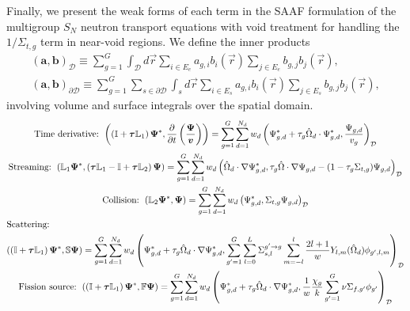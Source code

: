 \documentclass[letterpaper]{mc2025}
\begin{document}
Finally, we present the weak forms of each term in the \gls*{SAAF} formulation of the multigroup
$S_N$ neutron transport equations with void treatment \cite{wang_diffusion_2014} for handling the
$1/\Sigma_{t,g}$ term in near-void regions. We define the inner products
%
\begin{gather}
  \left(\bm{a},\bm{b}\right)_\mathcal{D} \equiv \sum^G_{g=1} \int_\mathcal{D}d\vec{r}
  \sum_{i\in E_e}a_{g,i}b_i(\vec{r})\sum_{j\in E_e}b_{g,j}b_j(\vec{r}), \\
  \left(\bm{a},\bm{b}\right)_{\partial\mathcal{D}} \equiv \sum^G_{g=1}
  \sum_{s\in\partial\mathcal{D}}\int_s d\vec{r}\sum_{i\in E_s}a_{g,i}b_i(\vec{r})\sum_{j\in E_s}
  b_{g,j}b_j(\vec{r}),
\end{gather}
%
involving volume and surface integrals over the spatial domain.
%
\begin{gather}
  \mbox{Time derivative: }
  \left(\left(\mathbb{I}+\bm{\tau}\mathbb{L}_1\right)\bm{\Psi}^*,
  \frac{\partial}{\partial t}\left(\frac{\bm{\Psi}}{\bm{v}}\right)\right) =
  \sum^G_{g=1}\sum^{N_d}_{d=1}w_d\left(\Psi^*_{g,d}+\tau_g\hat{\Omega}_d\cdot\Psi^*_{g,d},
  \frac{\Psi_{g,d}}{v_g}\right)_\mathcal{D} \label{eq:time-derivative} \\
  \mbox{Streaming: }
  \left(\mathbb{L}_1\bm{\Psi}^*,
  \left(\bm{\tau}\mathbb{L}_1-\mathbb{I}+\bm{\tau}\mathbb{L}_2\right)\bm{\Psi}\right) =
  \sum^G_{g=1}\sum^{N_d}_{d=1}w_d\left(\hat{\Omega}_d\cdot\nabla\Psi^*_{g,d},\tau_g\hat{\Omega}
  \cdot\nabla\Psi_{g,d}-(1-\tau_g\Sigma_{t,g})\Psi_{g,d}\right)_\mathcal{D} \\
  \mbox{Collision: }
  \left(\mathbb{L}_2\bm{\Psi}^*,\bm{\Psi}\right) =
  \sum^G_{g=1}\sum^{N_d}_{d=1}w_d\left(\Psi^*_{g,d},\Sigma_{t,g}\Psi_{g,d}\right)_\mathcal{D} \\
  \shortintertext{Scattering:}
  \left(\left(\mathbb{I}+\bm{\tau}\mathbb{L}_1\right)\bm{\Psi}^*,\mathbb{S}\bm{\Psi}\right) =
  \sum^G_{g=1}\sum^{N_d}_{d=1}w_d\left(\Psi^*_{g,d}+\tau_g\hat{\Omega}_d\cdot\nabla\Psi^*_{g,d},
  \sum^G_{g'=1}\sum^L_{l=0}\Sigma^{g'\rightarrow g}_{s,l}\sum^l_{m=-l}
  \frac{2l+1}{w}Y_{l,m}(\hat{\Omega}_d)\phi_{g',l,m}\right)_\mathcal{D} \\
  \mbox{Fission source: }
  \left(\left(\mathbb{I}+\bm{\tau}\mathbb{L}_1\right)\bm{\Psi}^*,\mathbb{F}\bm{\Psi}\right) =
  \sum^G_{g=1}\sum^{N_d}_{d=1}w_d\left(\Psi^*_{g,d}+\tau_g\hat{\Omega}_d\cdot\nabla\Psi^*_{g,d},
  \frac{1}{w}\frac{\chi_g}{k}\sum^G_{g'=1}\nu\Sigma_{f,g'}\phi_{g'}\right)_\mathcal{D}
\end{gather}
%
\end{document}
